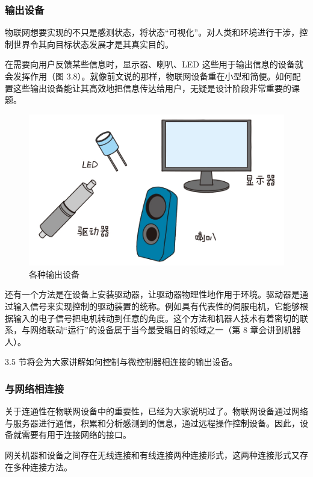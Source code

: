 \documentclass[12pt,UTF8]{ctexbook}
\begin{document}
\subsubsection{输出设备}

物联网想要实现的不只是感测状态，将状态“可视化”。对人类和环境进行干涉，控制世界令其向目标状态发展才是其真实目的。

在需要向用户反馈某些信息时，显示器、喇叭、LED 这些用于输出信息的设备就会发挥作用（图 3.8）。就像前文说的那样，物联网设备重在小型和简便。如何配置这些输出设备能让其高效地把信息传达给用户，无疑是设计阶段非常重要的课题。

\begin{figure}[htbp]
	\centering
	\includegraphics[width=1\linewidth]{59}
	\caption{各种输出设备}
	\label{fig:1}
\end{figure}

还有一个方法是在设备上安装驱动器，让驱动器物理性地作用于环境。驱动器是通过输入信号来实现控制的驱动装置的统称。例如具有代表性的伺服电机，它能够根据输入的电子信号把电机转动到任意的角度。这个方法和机器人技术有着密切的联系，与网络联动“运行”的设备属于当今最受瞩目的领域之一（第 8 章会讲到机器人）。

3.5 节将会为大家讲解如何控制与微控制器相连接的输出设备。

\subsubsection{与网络相连接}

关于连通性在物联网设备中的重要性，已经为大家说明过了。物联网设备通过网络与服务器进行通信，积累和分析感测到的信息，通过远程操作控制设备。因此，设备就需要有用于连接网络的接口。

网关机器和设备之间存在无线连接和有线连接两种连接形式，这两种连接形式又存在多种连接方法。
\end{document}
